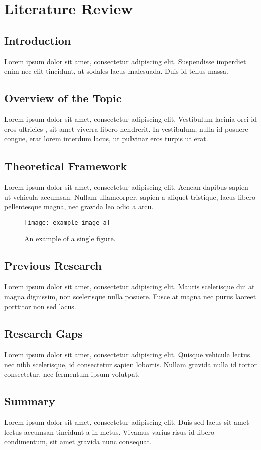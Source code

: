 \chapter{Literature Review}
\section{Introduction}
Lorem ipsum dolor sit amet, consectetur adipiscing elit. Suspendisse imperdiet enim nec elit tincidunt, at sodales lacus malesuada. Duis id tellus massa.

\section{Overview of the Topic}
Lorem ipsum dolor sit amet, consectetur adipiscing elit. Vestibulum lacinia orci id eros ultricies \cite{johnson2018deep}, sit amet viverra libero hendrerit. In vestibulum, nulla id posuere congue, erat lorem interdum lacus, ut pulvinar eros turpis ut erat.

\section{Theoretical Framework}
Lorem ipsum dolor sit amet, consectetur adipiscing elit. Aenean dapibus sapien ut vehicula accumsan. Nullam ullamcorper, sapien a aliquet tristique, lacus libero pellentesque magna, nec gravida leo odio a arcu.
\begin{figure}[ht]
    \centering
    \texttt{[image: example-image-a]}
    \caption{An example of a single figure.}
    \label{fig:single}
\end{figure}
\section{Previous Research}
Lorem ipsum dolor sit amet, consectetur adipiscing elit. Mauris scelerisque dui at magna dignissim, \cite{lee2019advances}non scelerisque nulla posuere. Fusce at magna nec purus laoreet porttitor non sed lacus.

\section{Research Gaps}
Lorem ipsum dolor sit amet, consectetur adipiscing elit. Quisque vehicula lectus nec nibh scelerisque, id consectetur sapien lobortis. Nullam gravida nulla id tortor consectetur, nec fermentum ipsum volutpat.

\section{Summary}
Lorem ipsum dolor sit amet, consectetur adipiscing elit. Duis sed lacus sit amet lectus accumsan tincidunt a in metus. Vivamus varius risus id libero condimentum, sit amet gravida nunc consequat.